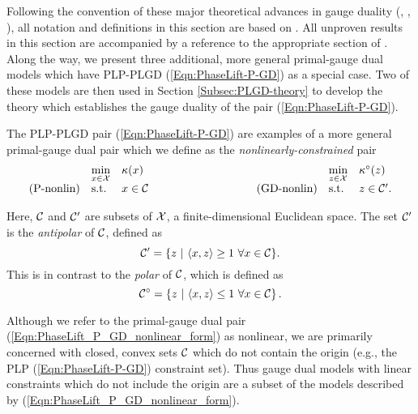 Following the convention of these major theoretical advances in gauge duality (\cite{DBLP:journals/mp/Freund87}, \cite{DBLP:journals/siamsc/FriedlanderM16}, \cite{aravkin2017foundations}), all notation and definitions in this section are based on \cite{rockafellar1970convex}.  All unproven results in this section are accompanied by a reference to the appropriate section of \cite{rockafellar1970convex}.  Along the way, we present three additional, more general primal-gauge dual models which have PLP-PLGD (\ref{Eqn:PhaseLift-P-GD}) as a special case.  Two of these models are then used in Section \ref{Subsec:PLGD-theory} to develop the theory which establishes the gauge duality of the pair (\ref{Eqn:PhaseLift-P-GD}).




The PLP-PLGD pair (\ref{Eqn:PhaseLift-P-GD}) are examples of a more general primal-gauge dual pair which we define as the \textit{nonlinearly-constrained} pair
\begin{equation} 			\label{Eqn:PhaseLift_P_GD_nonlinear_form}
\begin{array}{lllllll}
	&	\min\limits_{\substack{x \in \caX}}
		&	\kappa(x)
			&
				&	\min\limits_{\substack{z \in \caX}}
					&	\kappa^\circ(z)
						\\
\textnormal{(P-nonlin)}
	&	\st
		& 	x \in \caC
			&	\hspace{3cm} 	\textnormal{(GD-nonlin)}
				&	\st
					&	z \in \caC'.
\end{array}
\end{equation}

Here, ${\mathcal C}$ and ${\mathcal C}'$ are subsets of ${\mathcal X}$, a finite-dimensional Euclidean space.  The set ${\mathcal C}'$ is the \textit{antipolar} of ${\mathcal C}$, defined as
\begin{equation}  			\label{Def:antipolar_set}
{\mathcal C}' = \{ z \ | \ \langle x, z \rangle \geq 1 \ \forall x \in {\mathcal C} \}.
\end{equation}
This is in contrast to the \textit{polar} of ${\mathcal C}$, which is defined as
\begin{equation} 			\label{Def:polar}
{\mathcal C}^\circ = \left\{ z \ | \ \langle x, z \rangle \leq 1 \ \forall x \in {\mathcal C} \right\}.
\end{equation}

Although we refer to the primal-gauge dual pair (\ref{Eqn:PhaseLift_P_GD_nonlinear_form}) as nonlinear, we are primarily concerned with closed, convex sets ${\mathcal C}$ which do not contain the origin (e.g., the PLP (\ref{Eqn:PhaseLift-P-GD}) constraint set).  Thus gauge dual models with linear constraints which do not include the origin are a subset of the models described by (\ref{Eqn:PhaseLift_P_GD_nonlinear_form}).

